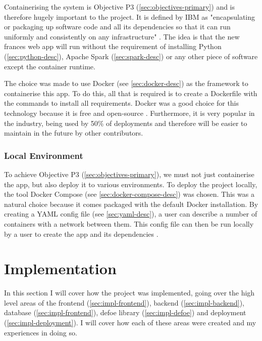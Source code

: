 \documentclass[12pt, letterpaper]{article}
\begin{document}
\begin{flushleft}
Containerising the system is Objective P3 (\ref{sec:objectives-primary}) and is therefore hugely important to the project. It is defined by IBM as "encapsulating or packaging up software code and all its dependencies so that it can run uniformly and consistently on any infrastructure" \cite{containers-def}. The idea is that the new frances web app will run without the requirement of installing Python (\ref{sec:python-desc}), Apache Spark (\ref{sec:spark-desc}) or any other piece of software except the container runtime.
\end{flushleft}

\begin{flushleft}
The choice was made to use Docker (see \ref{sec:docker-desc}) as the framework to containerise this app. To do this, all that is required is to create a Dockerfile with the commands to install all requirements. Docker was a good choice for this technology because it is free and open-source \cite{docker}. Furthermore, it is very popular in the industry, being used by 50\% of deployments \cite{docker-stats} and therefore will be easier to maintain in the future by other contributors.
\end{flushleft}

\subsubsection{Local Environment}\label{sec:design-local-env}

\begin{flushleft}
To achieve Objective P3 (\ref{sec:objectives-primary}), we must not just containerise the app, but also deploy it to various environments. To deploy the project locally, the tool Docker Compose (see \ref{sec:docker-compose-desc}) was chosen. This was a natural choice because it comes packaged with the default Docker installation. By creating a YAML config file (see \ref{sec:yaml-desc}), a user can describe a number of containers with a network between them. This config file can then be run locally by a user to create the app and its dependencies \cite{docker}.
\end{flushleft}

\section{Implementation}\label{sec:implementation}

\begin{flushleft}
In this section I will cover how the project was implemented, going over the high level areas of the frontend (\ref{sec:impl-frontend}), backend (\ref{sec:impl-backend}), database (\ref{sec:impl-frontend}), defoe library (\ref{sec:impl-defoe}) and deployment (\ref{sec:impl-deployment}). I will cover how each of these areas were created and my experiences in doing so.
\end{flushleft}
\end{document}
